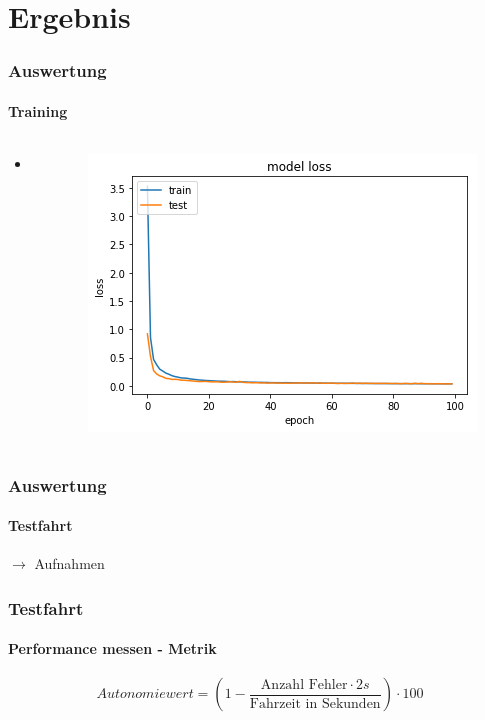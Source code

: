 \documentclass{beamer}
\begin{document}
\section{Ergebnis}
\frame{\tableofcontents[currentsection]}

\begin{frame}
\frametitle{Auswertung}
\framesubtitle{Training}

\begin{columns}[T]

\begin{column}[T]{5cm}
\begin{itemize}
\item{}


\end{itemize}


\end{column}

\begin{column}[T]{6cm}
	\includegraphics[scale=0.44]{figures/loss.png}
\end{column}

\end{columns}

\end{frame}


\begin{frame}
\frametitle{Auswertung}
\framesubtitle{Testfahrt}

\centering
{\huge $\xrightarrow{}$} {\huge Aufnahmen} 

\end{frame}

\begin{frame}
\frametitle{Testfahrt}
\framesubtitle{Performance messen - Metrik}
\begin{equation}
Autonomiewert = (1 -  \frac{\text{Anzahl Fehler}\cdot 2 s}{\text{Fahrzeit in Sekunden}})\cdot 100
\end{equation}
\end{frame}
\end{document}
